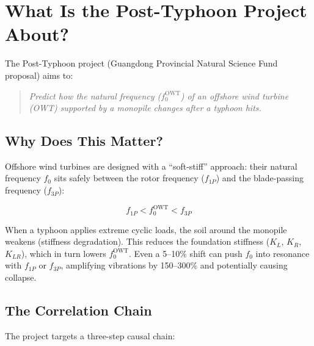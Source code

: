 \documentclass[11pt,a4paper]{article}
\begin{document}
\section{What Is the Post-Typhoon Project About?}

The Post-Typhoon project (Guangdong Provincial Natural Science Fund proposal) aims to:

\begin{quote}
\textit{Predict how the natural frequency ($f_0^{\text{OWT}}$) of an offshore wind turbine (OWT) supported by a monopile changes after a typhoon hits.}
\end{quote}

\subsection{Why Does This Matter?}

Offshore wind turbines are designed with a ``soft-stiff'' approach: their natural frequency $f_0$ sits safely between the rotor frequency ($f_{1P}$) and the blade-passing frequency ($f_{3P}$):

$$f_{1P} < f_0^{\text{OWT}} < f_{3P}$$

When a typhoon applies extreme cyclic loads, the soil around the monopile weakens (stiffness degradation). This reduces the foundation stiffness ($K_L$, $K_R$, $K_{LR}$), which in turn lowers $f_0^{\text{OWT}}$. Even a 5--10\% shift can push $f_0$ into resonance with $f_{1P}$ or $f_{3P}$, amplifying vibrations by 150--300\% and potentially causing collapse.

\subsection{The Correlation Chain}

The project targets a three-step causal chain:

\begin{center}
\end{center}
\end{document}
